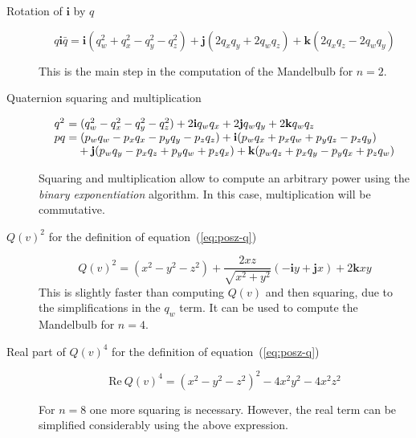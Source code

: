\documentclass{article}
\let\vec\mathbf
\newcommand{\mathnewlineeq}[1][\quad]{\\\phantom{#1 = }}
\begin{document}
\begin{description}
\item[Rotation of $\vec{i}$ by $q$]
\begin{equation*}
q\vec{i}\bar q =
  \vec{i}(q_w^2+q_x^2-q_y^2-q_z^2) + \vec{j} (2q_x q_y + 2q_w q_z)
  + \vec{k} (2 q_x q_z - 2 q_w q_y)
\end{equation*}

\noindent This is the main step in the computation of the Mandelbulb
for $n=2$.

\bigskip
\item[Quaternion squaring and multiplication]
\begin{equation*}
\begin{array}{l}
\hbox to 0pt{$q^2\hss$}\phantom{p q} =
  (q_w^2-q_x^2-q_y^2-q_z^2) + 2 \vec{i} q_w q_x + 2 \vec{j} q_w q_y
  + 2 \vec{k} q_w q_z\\
p q =       (p_w q_w - p_x q_x - p_y q_y - p_z q_z)
  + \vec{i} (p_w q_x + p_x q_w + p_y q_z - p_z q_y) \mathnewlineeq[p q]
  + \vec{j} (p_w q_y - p_x q_z + p_y q_w + p_z q_x)
  + \vec{k} (p_w q_z + p_x q_y - p_y q_x + p_z q_w)
\end{array}
\end{equation*}

\noindent
Squaring and multiplication allow to compute an arbitrary power using
the \emph{binary exponentiation} algorithm.  In this case, multiplication
will be commutative.

\bigskip
\item[$Q(v)^2$ for the definition of equation~(\ref{eq:posz-q})]
\begin{equation*}
Q(v)^2 =
  (x^2-y^2-z^2) + \frac{2xz}{\sqrt{x^2+y^2}} (-\vec{i} y + \vec{j} x)
  + 2\vec{k}xy
\end{equation*}
\noindent This is slightly faster than computing $Q(v)$ and then squaring,
due to the simplifications in the $q_w$ term.  It can be used to compute
the Mandelbulb for $n=4$.

\bigskip
\item[Real part of $Q(v)^4$ for the definition of equation~(\ref{eq:posz-q})]
\begin{equation*}
\mathrm{Re}~Q(v)^4 = (x^2-y^2-z^2)^2 - 4x^2 y^2 -4 x^2 z^2
\end{equation*}

For $n=8$ one more squaring is necessary.  However, the real term can
be simplified considerably using the above expression.
\end{description}
\end{document}
